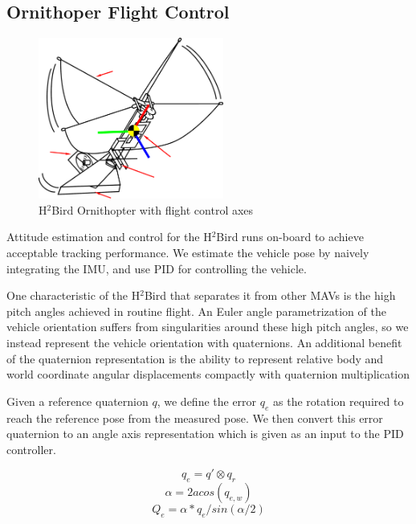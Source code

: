 \documentclass{aamas2013}
\begin{document}
\subsection{Ornithoper Flight Control}

\begin{figure}[tb]
\centering
\includegraphics[height=150pt]{figures/h2bird_axes.pdf}
\caption{H$^2$Bird Ornithopter with flight control axes}
\label{fig:h2Bird_axes}
\end{figure}

Attitude estimation and control for the H$^2$Bird runs on-board to achieve 
acceptable tracking performance. We estimate the vehicle pose by naively
integrating the IMU, and use PID for controlling the vehicle.

One characteristic of the H$^2$Bird that separates it from other MAVs is the
high pitch angles achieved in routine flight. An Euler angle 
parametrization of the vehicle orientation suffers from singularities
around these high pitch angles, so we instead represent the vehicle orientation
with quaternions. An additional benefit of the quaternion representation is 
the ability to represent relative body and world coordinate angular displacements 
compactly with quaternion multiplication

Given a reference quaternion $q$, we define the error $q_e$ as the rotation 
required to reach the reference pose from the measured pose. We then 
convert this error quaternion to an angle axis representation which is given
as an input to the PID controller. 

\begin{equation}
\label{quat_error}
q_e = q'\otimes q_r
\end{equation}
\begin{equation}
\label{quat_angle}
\alpha = 2acos(q_{e,w})
\end{equation}
\begin{equation}
\label{quat_linearize}
Q_e = \alpha*q_e/sin(\alpha /2)
\end{equation}
\end{document}

